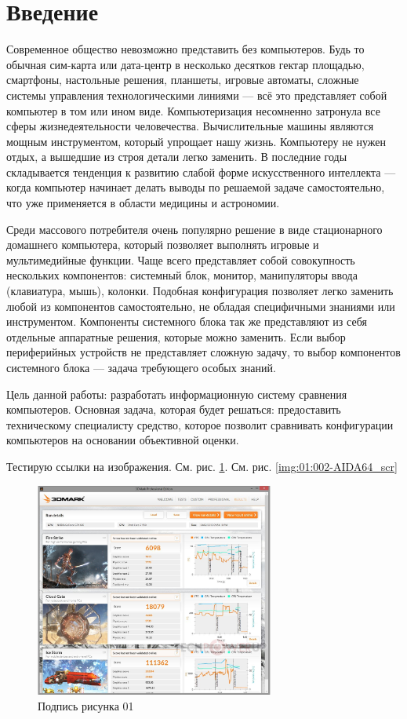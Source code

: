 \documentclass[oneside,final,12pt]{extreport}
\begin{document}
\section{Введение}
\par Современное общество невозможно представить без компьютеров. Будь то обычная сим-карта
или дата-центр в несколько десятков гектар площадью, смартфоны, настольные решения,
планшеты, игровые автоматы, сложные системы управления технологическими линиями — всё
это представляет собой компьютер в том или ином виде. Компьютеризация несомненно
затронула все сферы жизнедеятельности человечества. Вычислительные машины являются мощным
инструментом, который упрощает нашу жизнь. Компьютеру не нужен отдых, а вышедшие из строя
детали легко заменить. В последние годы складывается тенденция к развитию слабой форме
искусственного интеллекта — когда компьютер начинает делать выводы по решаемой задаче
самостоятельно, что уже применяется в области медицины и астрономии.
\par Среди массового потребителя очень популярно решение в виде стационарного домашнего
компьютера, который позволяет выполнять игровые и мультимедийные функции. Чаще всего
представляет собой совокупность нескольких компонентов: системный блок, монитор, манипуляторы
ввода (клавиатура, мышь), колонки. Подобная конфигурация позволяет легко заменить любой из
компонентов самостоятельно, не обладая специфичными знаниями или инструментом. Компоненты
системного блока так же представляют из себя отдельные аппаратные решения, которые можно
заменить. Если выбор периферийных устройств не представляет сложную задачу, то выбор
компонентов системного блока — задача требующего особых знаний.
\par Цель данной работы: разработать информационную систему сравнения компьютеров. Основная
задача, которая будет решаться: предоставить техническому специалисту средство, которое
позволит сравнивать конфигурации компьютеров на основании объективной оценки.
\par Тестирую ссылки на изображения. См. рис. \ref{img:01:3dm2}. См. рис. \ref{img:01:002-AIDA64_scr}
\begin{figure}[hp]
	\centering
	\includegraphics[width=0.7\textwidth]{images/001-3dm2}
	\caption{Подпись рисунка 01}
	\label{img:01:3dm2}
\end{figure}
\end{document}
